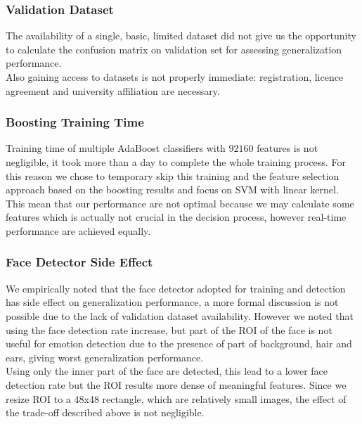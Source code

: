 \subsubsection*{Validation Dataset}

The availability of a single, basic, limited dataset did not give us the opportunity to calculate the confusion matrix on validation set for assessing generalization performance.\\ Also gaining access to datasets is not properly immediate: registration, licence agreement and university affiliation are necessary.

\subsubsection*{Boosting Training Time}

Training time of multiple AdaBoost classifiers with $92160$ features is not negligible, it took more than a day to complete the whole training process. For this reason we chose to temporary skip this training and the feature selection approach based on the boosting results and focus on SVM with linear kernel. This mean that our performance are not optimal because we may calculate some features which is actually not crucial in the decision process, however real-time performance are achieved equally.

\subsubsection*{Face Detector Side Effect}

We empirically noted that the face detector adopted for training and detection has side effect on generalization performance, a more formal discussion is not possible due to the lack of validation dataset availability. However we noted that using  the face detection rate increase, but part of the ROI of the face is not useful for emotion detection due to the presence of part of background, hair and ears, giving worst generalization performance. \\
Using  only the inner part of the face are detected, this lead to a lower face detection rate but the ROI results more dense of meaningful features. Since we resize ROI to a 48x48 rectangle, which are relatively small images, the effect of the trade-off described above is not negligible.\\

